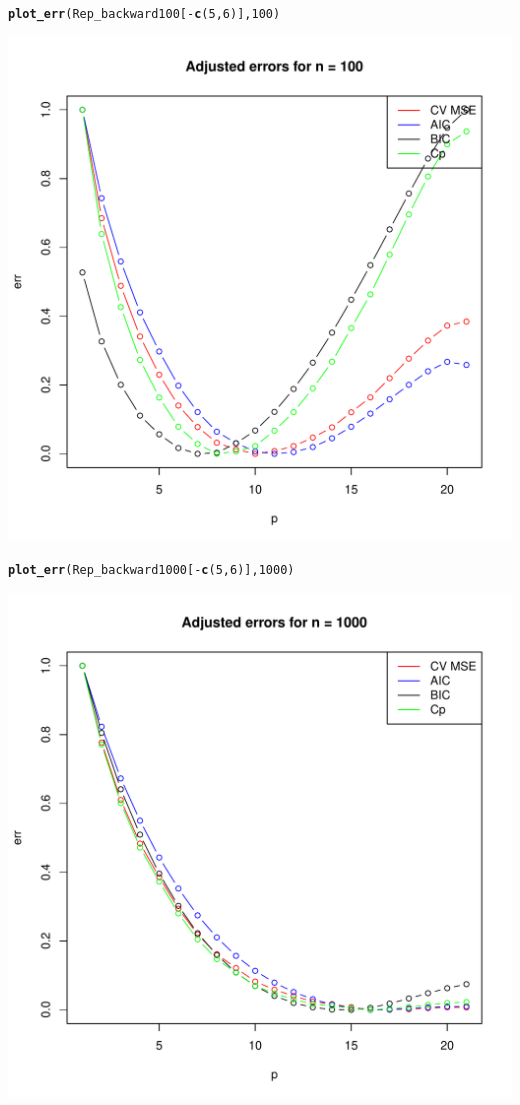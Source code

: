 \documentclass[11pt]{article}\usepackage[]{graphicx}\usepackage[]{color}
\makeatletter
\def\maxwidth{ %
  \ifdim\Gin@nat@width>\linewidth
    \linewidth
  \else
    \Gin@nat@width
  \fi
}
\newcommand{\hlnum}[1]{\textcolor[rgb]{0.686,0.059,0.569}{#1}}%
\newcommand{\hlopt}[1]{\textcolor[rgb]{0,0,0}{#1}}%
\newcommand{\hlstd}[1]{\textcolor[rgb]{0.345,0.345,0.345}{#1}}%
\newcommand{\hlkwd}[1]{\textcolor[rgb]{0.737,0.353,0.396}{\textbf{#1}}}%
\newenvironment{kframe}{%
 \def\at@end@of@kframe{}%
 \ifinner\ifhmode%
  \def\at@end@of@kframe{\end{minipage}}%
  \begin{minipage}{\columnwidth}%
 \fi\fi%
 \def\FrameCommand##1{\hskip\@totalleftmargin \hskip-\fboxsep
 \colorbox{shadecolor}{##1}\hskip-\fboxsep
     \hskip-\linewidth \hskip-\@totalleftmargin \hskip\columnwidth}%
 \MakeFramed {\advance\hsize-\width
   \@totalleftmargin\z@ \linewidth\hsize
   \@setminipage}}%
 {\par\unskip\endMakeFramed%
 \at@end@of@kframe}
\newenvironment{knitrout}{}{} %
\makeatother
\begin{document}
\begin{knitrout}
\begin{kframe}
\begin{alltt}
\hlkwd{plot_err}\hlstd{(Rep_backward100[}\hlopt{-}\hlkwd{c}\hlstd{(}\hlnum{5}\hlstd{,}\hlnum{6}\hlstd{)],}\hlnum{100}\hlstd{)}
\end{alltt}
\end{kframe}
\includegraphics[width=\maxwidth]{figure/unnamed-chunk-6-1} 
\begin{kframe}\begin{alltt}
\hlkwd{plot_err}\hlstd{(Rep_backward1000[}\hlopt{-}\hlkwd{c}\hlstd{(}\hlnum{5}\hlstd{,}\hlnum{6}\hlstd{)],}\hlnum{1000}\hlstd{)}
\end{alltt}
\end{kframe}
\includegraphics[width=\maxwidth]{figure/unnamed-chunk-6-2} 

\end{knitrout}
\end{document}
